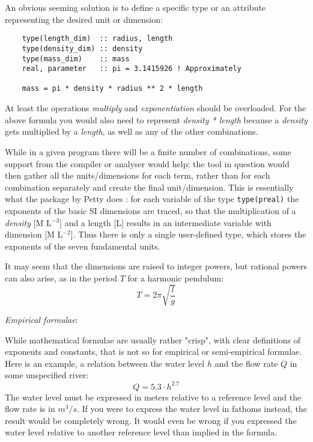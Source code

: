 \documentclass{article}
\begin{document}
An obvious seeming solution is to define a specific type or an attribute representing the desired unit or
dimension:

\begin{verbatim}
    type(length_dim)  :: radius, length
    type(density_dim) :: density
    type(mass_dim)    :: mass
    real, parameter   :: pi = 3.1415926 ! Approximately

    mass = pi * density * radius ** 2 * length
\end{verbatim}

At least the operations \emph{multiply} and \emph{exponentiation} should be overloaded.
For the above formula you would also need to represent \emph{density * length} because a \emph{density} gets
multiplied by a \emph{length}, as well as any of the other combinations.

While in a given program there will be a finite number of combinations, some support from the compiler or analyser
would help: the tool in question would then gather all the units/dimensions for each term, rather than for each
combination separately and create the final unit/dimension. This is essentially what the package by Petty
does \cite{PhysUnitsPetty}: for each variable of the type \verb+type(preal)+ the exponents of the basic SI dimensions are traced, so that the
multiplication of a \emph{density} [M L$^{-3}$] and a length [L] results in an intermediate variable with dimension
[M L$^{-2}$]. Thus there is only a single user-defined type, which stores the exponents of the seven fundamental units.

It may seem that the dimensions are raised to integer powers, but rational powers can also arise, as in the period $T$ for
a harmonic pendulum:
\begin{equation}
    T = 2 \pi \sqrt{\frac{l}{g}}
\end{equation}

\vspace{\baselineskip}
\noindent \emph{Empirical formulae}:

\noindent While mathematical formulae are usually rather "crisp", with clear definitions of exponents and constants, that
is not so for empirical or semi-empirical formulae. Here is an example, a relation between the water level $h$ and the
flow rate $Q$ in some unspecified river:
%
\begin{equation}
    Q = 5.3 \cdot h^{2.7}
\end{equation}
%
The water level must be expressed in meters relative to a reference level and the flow rate is in $m^3/s$. If you were
to express the water level in fathoms instead, the result would be completely wrong. It would even be wrong if you
expressed the water level relative to another reference level than implied in the formula.
\end{document}
